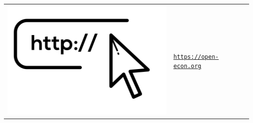 \begin{frame}
\begin{table}[]
\begin{tabularx}{1\textwidth}{>{\centering\arraybackslash}m{1.5cm} >{\arraybackslash}m{5cm}}
		\href{https://open-econ.org}{\includegraphics[scale=0.20]{material/crop-website.png}} & \href{https://open-econ.org}{\texttt{https://open-econ.org}}
	\end{tabularx}
\end{table}

\end{frame}


\backupend

%
%
%
%
%
